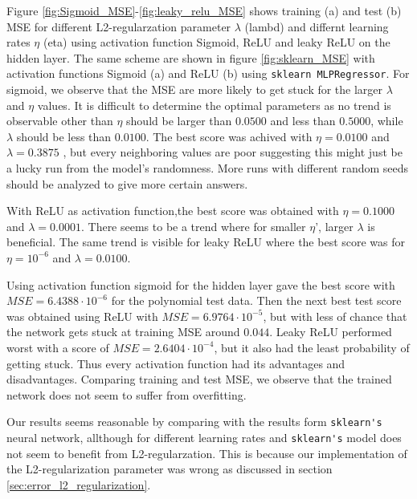 Figure \ref{fig:Sigmoid_MSE}-\ref{fig:leaky_relu_MSE} shows training (a) and test (b) MSE for different 
L2-regularzation parameter $\lambda $ (lambd) and differnt learning rates $\eta $ (eta) using activation function Sigmoid, ReLU and leaky 
ReLU on the hidden layer. The same scheme are shown in figure \ref{fig:sklearn_MSE} with activation functions Sigmoid (a) 
and ReLU (b) using \verb|sklearn MLPRegressor|. For sigmoid, we observe that the MSE are more likely to get stuck
for the larger $\lambda $ and $\eta $ values. 
It is difficult to determine the optimal parameters as no trend is observable other than $\eta $ should be larger than 
$0.0500$ and less than $0.5000$, while $\lambda $ should be less than $0.0100$. The best score was achived with 
$\eta =0.0100$ and $\lambda = 0.3875$ , but every neighboring values are poor suggesting this might just be a lucky run from the 
model's randomness. More runs with different 
random seeds should be analyzed to give more certain answers.

With ReLU as activation function,the best score was obtained with $\eta =0.1000$ and $\lambda  =0.0001$. There seems to be a trend 
where for smaller $\eta $', larger $\lambda $ is beneficial. The same trend is visible for leaky ReLU where the best score 
was for $\eta= 10^{-6}$ and $\lambda = 0.0100$.

Using activation function sigmoid for the hidden layer gave the best score with $MSE=6.4388 \cdot 10^{-6}$ for the polynomial test data.
Then the next best test score was obtained using ReLU with $MSE=6.9764 \cdot 10^{-5}$, but with less of chance that the network 
gets stuck at training MSE around $0.044$. Leaky ReLU performed worst with a score of $MSE=2.6404 \cdot 10^{-4}$, but it also 
had the least probability of getting stuck. Thus every activation function had its advantages and disadvantages. Comparing 
training and test MSE, we observe that the trained network does not seem to suffer from overfitting.  

Our results seems reasonable by comparing with the results form \verb|sklearn's| neural network, allthough for different learning rates
and \verb|sklearn's| model does not seem to benefit from L2-regularzation. This is because our implementation of the L2-regularization 
parameter was wrong as discussed in section \ref{sec:error_l2_regularization}.

